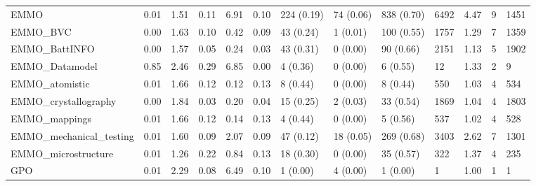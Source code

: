 \begin{table}
\begin{tabular}{m{3.5cm}m{2cm}m{2cm}m{2cm}m{2cm}m{2cm}m{2cm}m{2cm}m{2cm}m{2cm}m{2cm}m{2cm}m{2cm}}
EMMO                    &                0.01 &                  1.51 &                   0.11 &               6.91 &               0.10 &  224 (0.19) &   74 (0.06) &   838 (0.70) &            6492 &     4.47 &          9 &              1451 \\
EMMO\_BVC                &                0.00 &                  1.63 &                   0.10 &               0.42 &               0.09 &   43 (0.24) &    1 (0.01) &   100 (0.55) &            1757 &     1.29 &          7 &              1359 \\
EMMO\_BattINFO           &                0.00 &                  1.57 &                   0.05 &               0.24 &               0.03 &   43 (0.31) &    0 (0.00) &    90 (0.66) &            2151 &     1.13 &          5 &              1902 \\
EMMO\_Datamodel          &                0.85 &                  2.46 &                   0.29 &               6.85 &               0.00 &    4 (0.36) &    0 (0.00) &     6 (0.55) &              12 &     1.33 &          2 &                 9 \\
EMMO\_atomistic          &                0.01 &                  1.66 &                   0.12 &               0.12 &               0.13 &    8 (0.44) &    0 (0.00) &     8 (0.44) &             550 &     1.03 &          4 &               534 \\
EMMO\_crystallography    &                0.00 &                  1.84 &                   0.03 &               0.20 &               0.04 &   15 (0.25) &    2 (0.03) &    33 (0.54) &            1869 &     1.04 &          4 &              1803 \\
EMMO\_mappings           &                0.01 &                  1.66 &                   0.12 &               0.14 &               0.13 &    4 (0.44) &    0 (0.00) &     5 (0.56) &             537 &     1.02 &          4 &               528 \\
EMMO\_mechanical\_testing &                0.01 &                  1.60 &                   0.09 &               2.07 &               0.09 &   47 (0.12) &   18 (0.05) &   269 (0.68) &            3403 &     2.62 &          7 &              1301 \\
EMMO\_microstructure     &                0.01 &                  1.26 &                   0.22 &               0.84 &               0.13 &   18 (0.30) &    0 (0.00) &    35 (0.57) &             322 &     1.37 &          4 &               235 \\
GPO                     &                0.01 &                  2.29 &                   0.08 &               6.49 &               0.10 &    1 (0.00) &    4 (0.00) &     1 (0.00) &               1 &     1.00 &          1 &                 1 \\

\end{tabular}
\end{table}

